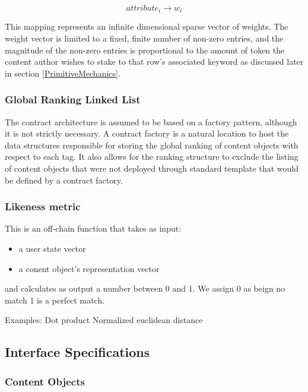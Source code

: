 \begin{equation}
    attribute_i \rightarrow w_i
\end{equation}

This mapping represents an infinite dimensional sparse vector of weights. The weight vector is limited to a fixed, finite number of non-zero entries, and the magnitude of the non-zero entries is proportional to the amount of token the content author wishes to stake to that row’s associated keyword as discussed later in section \ref{PrimitiveMechanics}.

\subsubsection{Global Ranking Linked List}


The contract architecture is assumed to be based on a factory pattern, although it is not strictly necessary. A contract factory is a natural location to host the data structures responsible for storing the global ranking of content objects with respect to each tag. It also allows for the ranking structure to exclude the listing of content objects that were not deployed through standard template that would be defined by a contract factory. 



\subsubsection{Likeness metric}
This is an off-chain function that takes as input:

\begin{itemize}
    \item a user state vector
    \item a conent object's representation vector
\end{itemize}
and calculates as output a number between 0 and 1. We assign 0 as beign no match 1 is a perfect match.

Examples:
Dot product
Normalized euclidean distance

\subsection{Interface Specifications}
\label{InterfaceDefinition}

\subsubsection{Content Objects}

